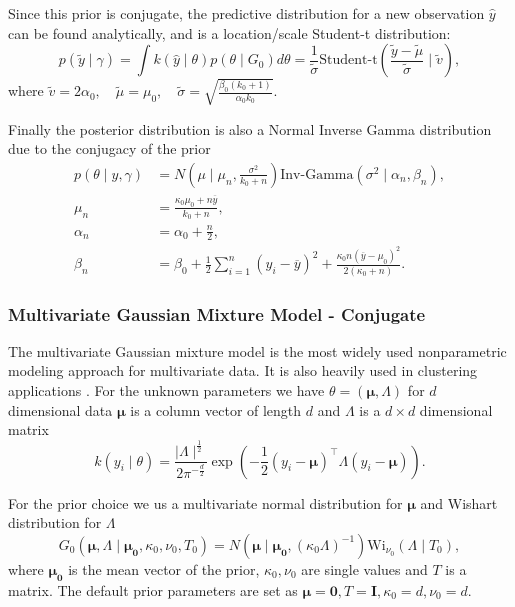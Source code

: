 \documentclass[nojss]{jss}
\begin{document}
Since this prior is conjugate, the predictive distribution for a new observation $\hat{y}$ can be found analytically, and is a location/scale Student-t distribution:
\begin{equation*}
p(\tilde{y} \mid \gamma) = \int k(\hat{y}\mid\theta) p(\theta \mid G_0) d\theta = \frac{1}{\tilde{\sigma}} \text{Student-t} \left( \frac{ \tilde{y} - \tilde{\mu}}{\tilde{\sigma}} \mid \tilde{v}\right),
\end{equation*}
where $\tilde{v} = 2 \alpha_0, \quad \tilde{\mu} = \mu_0, \quad \tilde{\sigma} = \sqrt{ \frac{\beta_0 (k_0 + 1)}{\alpha_0 k_0}}$.

Finally the posterior distribution is also a Normal Inverse Gamma distribution due to the conjugacy of the prior
\begin{align*}
p(\theta \mid y, \gamma) & = N ( \mu \mid \mu _n , \frac{\sigma ^2}{k_0 + n}  ) \text{Inv-Gamma} ( \sigma ^2 \mid \alpha _n , \beta _n), \\
\mu _n & = \frac{\kappa _0 \mu _0 + n \overline{y}}{k_0 + n}, \\
\alpha _n & = \alpha _0 + \frac{n}{2}, \\
\beta _n & = \beta _0 + \frac{1}{2} \sum _{i=1} ^n (y_i - \overline{y} ) ^2 + \frac{\kappa _0 n (\overline{y} - \mu _0)^2}{2(\kappa _0 + n)} .
\end{align*}

\subsubsection{Multivariate Gaussian Mixture Model - Conjugate}

The multivariate Gaussian mixture model is the most widely used nonparametric modeling approach for multivariate data. It is also heavily used in clustering applications \citep{maceachern_estimating_1998}. For the unknown parameters we have $\theta = ( \boldsymbol{\mu}, \Lambda )$ for $d$ dimensional data $\boldsymbol{\mu}$ is a column vector of length $d$ and $\Lambda$ is a $d \times d$ dimensional matrix
\begin{equation*}
k(y_i \mid \theta) = \frac{\mid \Lambda \mid ^{\frac{1}{2}}}{2 \pi ^{- \frac{d}{2}}} \exp \left( - \frac{1}{2} (y_i - \boldsymbol{\mu})^\top \Lambda (y_i - \boldsymbol{\mu})  \right).
\end{equation*}

For the prior choice we us a multivariate normal distribution for $\boldsymbol{\mu}$ and Wishart distribution for $\Lambda$
\begin{equation*}
G_0 (\boldsymbol{\mu} , \Lambda \mid  \boldsymbol{\mu _0} , \kappa _0, \nu _0, T_0)  = N ( \boldsymbol{\mu} \mid \boldsymbol{\mu _0} , (\kappa _0 \Lambda )^{-1} ) \text{Wi} _{\nu _0} (\Lambda \mid T_0),
\end{equation*}
where $\boldsymbol{\mu _0}$ is the mean vector of the prior, $\kappa _0, \nu _0$ are single values and $T$ is a matrix. The default prior parameters are set as $\boldsymbol{\mu} = \mathbf{0}, T = \mathbf{I}, \kappa_0 = d, \nu_0 = d$.
\end{document}
